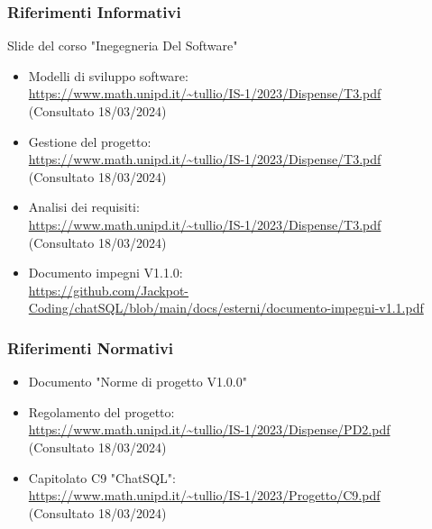 \documentclass[5pt]{article}
\begin{document}
    \subsubsection{Riferimenti Informativi}
      Slide del corso "Inegegneria Del Software"
      \begin{itemize}
            \item Modelli di sviluppo software: \\ \url{https://www.math.unipd.it/~tullio/IS-1/2023/Dispense/T3.pdf}\\
            (Consultato 18/03/2024)
            \item Gestione del progetto: \\
            \url{https://www.math.unipd.it/~tullio/IS-1/2023/Dispense/T3.pdf}\\
            (Consultato 18/03/2024)
            \item Analisi dei requisiti: \\
            \url{https://www.math.unipd.it/~tullio/IS-1/2023/Dispense/T3.pdf}\\
            (Consultato 18/03/2024)
            \item Documento impegni V1.1.0: \\
            \url{https://github.com/Jackpot-Coding/chatSQL/blob/main/docs/esterni/documento-impegni-v1.1.pdf}\\
      \end{itemize}
    \subsubsection{Riferimenti Normativi}
      \begin{itemize}
            \item Documento "Norme di progetto V1.0.0"
            \item Regolamento del progetto: \\ \url{https://www.math.unipd.it/~tullio/IS-1/2023/Dispense/PD2.pdf}\\
            (Consultato 18/03/2024)
            \item Capitolato C9 "ChatSQL": \\
            \url{https://www.math.unipd.it/~tullio/IS-1/2023/Progetto/C9.pdf}\\
            (Consultato 18/03/2024)
      \end{itemize}
\end{document}
